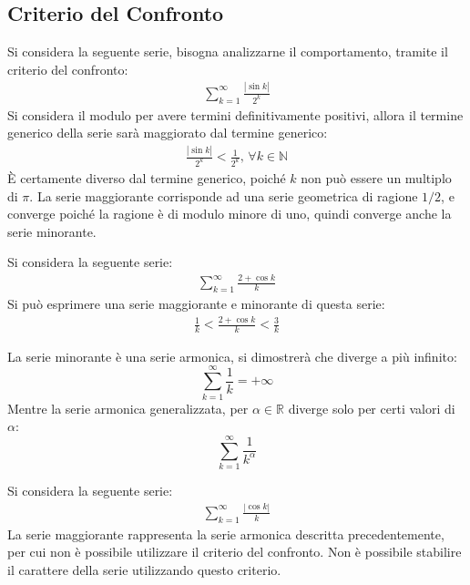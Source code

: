 \documentclass{article}
\numberwithin{equation}{subsection}
\begin{document}
\subsection{Criterio del Confronto}

Si considera la seguente serie, bisogna analizzarne il comportamento, tramite il criterio del confronto:
\begin{gather*}
    \displaystyle\sum_{k=1}^\infty\frac{|\sin k|}{2^k}
\end{gather*}
Si considera il modulo per avere termini definitivamente positivi, allora il termine generico della serie sarà maggiorato dal termine generico:
\begin{gather*}
    \displaystyle\frac{|\sin k|}{2^k}<\frac{1}{2^k},\,\forall k\in\mathbb{N}
\end{gather*}
È certamente diverso dal termine generico, poiché $k$ non può essere un multiplo di $\pi$. 
La serie maggiorante corrisponde ad una serie geometrica di ragione $1/2$, e converge poiché la ragione è di modulo minore di uno, quindi converge anche la serie minorante. 

Si considera la seguente serie:
\begin{gather*}
    \displaystyle\sum_{k=1}^\infty\frac{2+\cos k}{k}
\end{gather*}
Si può esprimere una serie maggiorante e minorante di questa serie:
\begin{gather*}
    \displaystyle\frac{1}{k}<\frac{2+\cos k}{k}<\frac{3}{k}
\end{gather*}

La serie minorante è una serie armonica, si dimostrerà che diverge a più infinito:
\begin{equation*}
    \displaystyle\sum_{k=1}^\infty\frac{1}{k}=+\infty
\end{equation*}
Mentre la serie armonica generalizzata, per $\alpha\in\mathbb{R}$ diverge solo per certi valori di $\alpha$:
\begin{equation*}
    \displaystyle\sum_{k=1}^\infty\frac{1}{k^\alpha}
\end{equation*}

Si considera la seguente serie:
\begin{gather*}
    \displaystyle\sum_{k=1}^\infty\frac{|\cos k|}{k}
\end{gather*}
La serie maggiorante rappresenta la serie armonica descritta precedentemente, per cui non è possibile utilizzare il criterio del confronto. Non è possibile stabilire il carattere della serie utilizzando questo criterio. 
\end{document}
